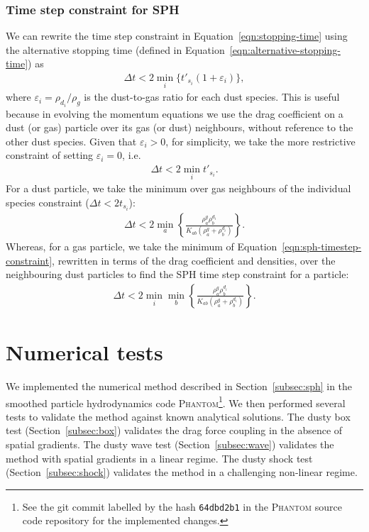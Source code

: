 \documentclass[fleqn,usenatbib]{mnras}
\begin{document}
\subsubsection{Time step constraint for SPH}

We can rewrite the time step constraint in Equation~\ref{eqn:stopping-time}
using the alternative stopping time
(defined in Equation~\ref{eqn:alternative-stopping-time}) as
%
\begin{align}
   \Delta t < 2 \min_i \{t'_{s_i} (1 + \varepsilon_i)\},
\end{align}
%
where \(\varepsilon_i = \rho_{d_i} / \rho_g\) is the dust-to-gas ratio for each
dust species. This is useful because in evolving the momentum equations we use
the drag coefficient on a dust (or gas) particle over its gas (or dust)
neighbours, without reference to the other dust species. Given that
\(\varepsilon_i > 0\), for simplicity, we take the more restrictive constraint of
setting \(\varepsilon_i = 0\), i.e.
%
\begin{align}
   \label{eqn:sph-timestep-constraint}
   \Delta t < 2 \min_i t'_{s_i}.
\end{align}
%
For a dust particle, we take the minimum over gas neighbours of the individual
species constraint (\(\Delta t < 2 t_{s_i}\)):
%
\begin{align}
   \Delta t < 2 \min_{a}
   \left\{ \frac{\rho^g_a \rho^{d_i}_b}{K_{ab} (\rho^g_a + \rho^{d_i}_b)} \right\}.
\end{align}
%
Whereas, for a gas particle, we take the minimum of
Equation~\ref{eqn:sph-timestep-constraint}, rewritten in terms of the drag
coefficient and densities, over the neighbouring dust particles to find the SPH
time step constraint for a particle:
%
\begin{align}
   \Delta t < 2 \min_i \min_{b}
   \left\{ \frac{\rho^g_a \rho^{d_i}_b}{K_{ab} (\rho^g_a + \rho^{d_i}_b)} \right\}.
\end{align}
%

\section{Numerical tests}%
\label{sec:tests}

We implemented the numerical method described in Section~\ref{subsec:sph} in the
smoothed particle hydrodynamics code \textsc{Phantom}\footnote{See the git
commit labelled by the hash \texttt{64dbd2b1} in the \textsc{Phantom} source
code repository for the implemented changes.}. We then performed several tests
to validate the method against known analytical solutions. The dusty box test
(Section~\ref{subsec:box}) validates the drag force coupling in the absence of
spatial gradients. The dusty wave test (Section~\ref{subsec:wave}) validates the
method with spatial gradients in a linear regime. The dusty shock test
(Section~\ref{subsec:shock}) validates the method in a challenging non-linear
regime.
\end{document}
